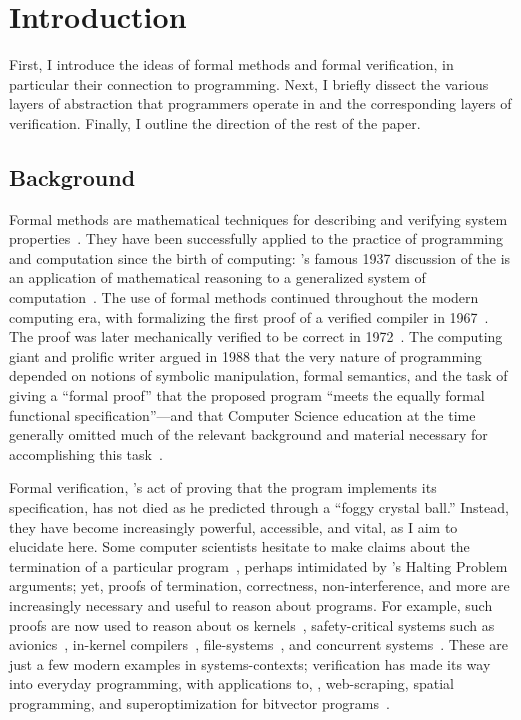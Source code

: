\section{Introduction}

First, I introduce the ideas of formal methods and formal verification, in
particular their connection to programming. Next, I briefly dissect the various
layers of abstraction that programmers operate in and the corresponding
layers of verification. Finally, I outline the direction of the rest of the
paper.

\subsection{Background}\label{S:background}

Formal methods are mathematical techniques for describing and verifying system
properties~\cite{Wing_90}. They have been successfully applied to the practice
of programming and computation since the birth of computing:
\citeauthor{Turing_1937}'s famous 1937 discussion of the {\haltprob} is an
application of mathematical reasoning to a generalized system of
computation~\cite{Turing_1937}. The use of formal methods continued throughout
the modern computing era, with \citeauthor{McCarthy_67} formalizing the first
proof of a verified compiler in 1967~\cite{McCarthy_67}. The proof was later
mechanically verified to be correct in 1972~\cite{Milner_72}. The computing
giant and prolific writer \citeauthor{EWD:EWD1036} argued in 1988 that the very
nature of programming depended on notions of symbolic manipulation, formal
semantics, and the task of giving a ``formal proof'' that the proposed program
``meets the equally formal functional specification''---and that Computer
Science education at the time generally omitted much of the relevant background
and material necessary for accomplishing this task~\cite{EWD:EWD1036}.

Formal verification, \citeauthor{EWD:EWD1036}'s act of proving that the program
implements its specification, has not died as he predicted through a ``foggy
crystal ball.'' Instead, they have become increasingly powerful, accessible, and
vital, as I aim to elucidate here. Some computer scientists hesitate to make
claims about the termination of a particular program~\cite{Cook_2011}, perhaps
intimidated by \citeauthor{Turing_1937}'s Halting Problem arguments; yet, proofs
of termination, correctness, non-interference, and more are increasingly
necessary and useful to reason about programs. For example, such proofs are now
used to reason about \gls{os}
kernels~\cite{Klein_EHACDEEKNSTW_09,Klein_AEHCDEEKNSTW_10,Klein_AEMSKH_14,Sewell_KH_16,Narayanan_2019,Narayan_2020,Nelson_2017},
safety-critical systems such as avionics~\cite[\S 1]{Leroy-Compcert-CACM},
in-kernel compilers~\cite{186144,258848}, file-systems~\cite{Zou_2019}, and
concurrent systems~\cite{222565,222621}. These are just a few modern examples in
systems-contexts; verification has made its way into everyday programming, with
applications to, \eg, web-scraping, spatial programming, and superoptimization
for bitvector programs~\cite[\S 4]{Torlak_2013}.

